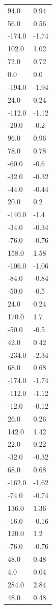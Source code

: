 \begin{longtable}{ll}
94.0 & 0.94 \\
56.0 & 0.56 \\
-174.0 & -1.74 \\
102.0 & 1.02 \\
72.0 & 0.72 \\
0.0 & 0.0 \\
-194.0 & -1.94 \\
24.0 & 0.24 \\
-112.0 & -1.12 \\
-20.0 & -0.2 \\
96.0 & 0.96 \\
78.0 & 0.78 \\
-60.0 & -0.6 \\
-32.0 & -0.32 \\
-44.0 & -0.44 \\
20.0 & 0.2 \\
-140.0 & -1.4 \\
-34.0 & -0.34 \\
-76.0 & -0.76 \\
158.0 & 1.58 \\
-106.0 & -1.06 \\
-84.0 & -0.84 \\
-50.0 & -0.5 \\
24.0 & 0.24 \\
170.0 & 1.7 \\
-50.0 & -0.5 \\
42.0 & 0.42 \\
-234.0 & -2.34 \\
68.0 & 0.68 \\
-174.0 & -1.74 \\
-112.0 & -1.12 \\
-12.0 & -0.12 \\
26.0 & 0.26 \\
142.0 & 1.42 \\
22.0 & 0.22 \\
-32.0 & -0.32 \\
68.0 & 0.68 \\
-162.0 & -1.62 \\
-74.0 & -0.74 \\
136.0 & 1.36 \\
-16.0 & -0.16 \\
120.0 & 1.2 \\
-76.0 & -0.76 \\
48.0 & 0.48 \\
4.0 & 0.04 \\
284.0 & 2.84 \\
48.0 & 0.48 \\

\end{longtable}
